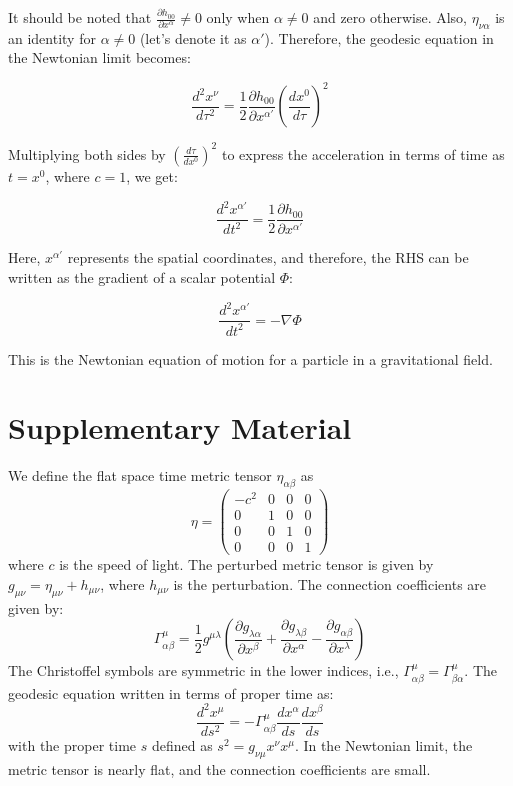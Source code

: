\documentclass[a4paper, 12pt]{article}
\begin{document}
It should be noted that $\frac{\partial h_{0 0}}{\partial x^\alpha}\neq0$ only when $\alpha\neq0$ and zero otherwise. Also, $\eta_{\nu\alpha}$ is an identity for $\alpha\neq0$ (let's denote it as $\alpha'$). Therefore, the geodesic equation in the Newtonian limit becomes:

\begin{equation}
    \frac{d^2x^\nu}{d\tau^2}=\frac{1}{2}\frac{\partial h_{0 0}}{\partial x^{\alpha'}}\left(\frac{dx^0}{d\tau}\right)^2
\end{equation}

Multiplying both sides by $\left(\frac{d\tau}{dx^0}\right)^2$ to express the acceleration in terms of time as $t=x^0$, where $c=1$, we get:

\begin{equation}
    \frac{d^2x^{\alpha'}}{dt^2}=\frac{1}{2}\frac{\partial h_{0 0}}{\partial x^{\alpha'}}
\end{equation}

Here, $x^{\alpha'}$ represents the spatial coordinates, and therefore, the RHS can be written as the gradient of a scalar potential $\Phi$:

\begin{equation}
    \frac{d^2x^{\alpha'}}{dt^2}=-\nabla\Phi
\end{equation}

This is the Newtonian equation of motion for a particle in a gravitational field.

\section*{ Supplementary Material}
We define the flat space time metric tensor $\eta_{\alpha\beta}$ as
\[\eta ={\begin{pmatrix}-c^{2}&0&0&0\\0&1&0&0\\0&0&1&0\\0&0&0&1\end{pmatrix}}\]
where $c$ is the speed of light. The perturbed metric tensor is given by $g_{\mu\nu}=\eta_{\mu\nu}+h_{\mu\nu}$, where $h_{\mu\nu}$ is the perturbation. The connection coefficients are given by:
\[\Gamma^\mu_{\alpha\beta}=\frac{1}{2}g^{\mu\lambda}\left(\frac{\partial g_{\lambda\alpha}}{\partial x^\beta}+\frac{\partial g_{\lambda\beta}}{\partial x^\alpha}-\frac{\partial g_{\alpha\beta}}{\partial x^\lambda}\right)\]
The Christoffel symbols are symmetric in the lower indices, i.e., $\Gamma^\mu_{\alpha\beta}=\Gamma^\mu_{\beta\alpha}$. The geodesic equation written in terms of proper time as:
\[\frac{d^2x^\mu}{ds^2}=-\Gamma^\mu_{\alpha\beta}\frac{dx^\alpha}{ds}\frac{dx^\beta}{ds}\]
with the proper time $s$ defined as $s^2=g_{\nu\mu}x^\nu x^\mu$. In the Newtonian limit, the metric tensor is nearly flat, and the connection coefficients are small.
\end{document}
